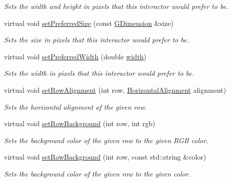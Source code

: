 \begin{DoxyCompactItemize}
\begin{DoxyCompactList}\small\item\em Sets the width and height in pixels that this interactor would prefer to be. \end{DoxyCompactList}\item 
virtual void \mbox{\hyperlink{classsgl_1_1GInteractor_aa22d9be4bc0e078bb0ea69b0fc9d7c75}{set\+Preferred\+Size}} (const \mbox{\hyperlink{structsgl_1_1GDimension}{G\+Dimension}} \&size)
\begin{DoxyCompactList}\small\item\em Sets the size in pixels that this interactor would prefer to be. \end{DoxyCompactList}\item 
virtual void \mbox{\hyperlink{classsgl_1_1GInteractor_a3db429ab2fa52efd187eec0ed8cdd9f2}{set\+Preferred\+Width}} (double \mbox{\hyperlink{classsgl_1_1GTable_ad72663daf610f2a0833a2fc3d78e4fdf}{width}})
\begin{DoxyCompactList}\small\item\em Sets the width in pixels that this interactor would prefer to be. \end{DoxyCompactList}\item 
virtual void \mbox{\hyperlink{classsgl_1_1GTable_ac6a47ba68c502b7d8dc776beeeffccc3}{set\+Row\+Alignment}} (int row, \mbox{\hyperlink{namespacesgl_aa00e70829e72ff16addc4d9f06fe3bc5}{Horizontal\+Alignment}} alignment)
\begin{DoxyCompactList}\small\item\em Sets the horizontal alignment of the given row. \end{DoxyCompactList}\item 
virtual void \mbox{\hyperlink{classsgl_1_1GTable_a85ee577aabd189ed64a5c9f66ba61fd2}{set\+Row\+Background}} (int row, int rgb)
\begin{DoxyCompactList}\small\item\em Sets the background color of the given row to the given R\+GB color. \end{DoxyCompactList}\item 
virtual void \mbox{\hyperlink{classsgl_1_1GTable_a30c7073dfeac833056ed65a8bb9a7e08}{set\+Row\+Background}} (int row, const std\+::string \&color)
\begin{DoxyCompactList}\small\item\em Sets the background color of the given row to the given color. \end{DoxyCompactList}\item 

\end{DoxyCompactItemize}

